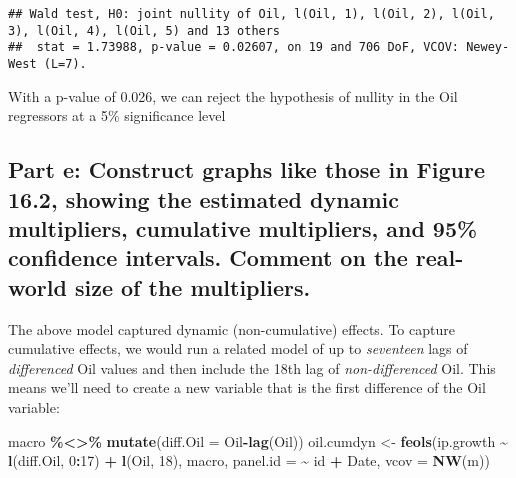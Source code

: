 \documentclass[
]{article}
\newenvironment{Shaded}{\begin{snugshade}}{\end{snugshade}}
\newcommand{\AttributeTok}[1]{\textcolor[rgb]{0.13,0.29,0.53}{#1}}
\newcommand{\DecValTok}[1]{\textcolor[rgb]{0.00,0.00,0.81}{#1}}
\newcommand{\FunctionTok}[1]{\textcolor[rgb]{0.13,0.29,0.53}{\textbf{#1}}}
\newcommand{\NormalTok}[1]{#1}
\newcommand{\OtherTok}[1]{\textcolor[rgb]{0.56,0.35,0.01}{#1}}
\newcommand{\SpecialCharTok}[1]{\textcolor[rgb]{0.81,0.36,0.00}{\textbf{#1}}}
\begin{document}
\begin{verbatim}
## Wald test, H0: joint nullity of Oil, l(Oil, 1), l(Oil, 2), l(Oil, 3), l(Oil, 4), l(Oil, 5) and 13 others
##  stat = 1.73988, p-value = 0.02607, on 19 and 706 DoF, VCOV: Newey-West (L=7).
\end{verbatim}

With a p-value of 0.026, we can reject the hypothesis of nullity in the
Oil regressors at a 5\% significance level

\hypertarget{part-e-construct-graphs-like-those-in-figure-16.2-showing-the-estimated-dynamic-multipliers-cumulative-multipliers-and-95-confidence-intervals.-comment-on-the-real-world-size-of-the-multipliers.}{%
\subsection{Part e: Construct graphs like those in Figure 16.2, showing
the estimated dynamic multipliers, cumulative multipliers, and 95\%
confidence intervals. Comment on the real-world size of the
multipliers.}\label{part-e-construct-graphs-like-those-in-figure-16.2-showing-the-estimated-dynamic-multipliers-cumulative-multipliers-and-95-confidence-intervals.-comment-on-the-real-world-size-of-the-multipliers.}}

The above model captured dynamic (non-cumulative) effects. To capture
cumulative effects, we would run a related model of up to
\emph{seventeen} lags of \emph{differenced} Oil values and then include
the 18th lag of \emph{non-differenced} Oil. This means we'll need to
create a new variable that is the first difference of the Oil variable:

\begin{Shaded}
\begin{Highlighting}[]
\NormalTok{macro }\SpecialCharTok{\%\textless{}\textgreater{}\%} \FunctionTok{mutate}\NormalTok{(}\AttributeTok{diff.Oil =}\NormalTok{ Oil}\SpecialCharTok{{-}}\FunctionTok{lag}\NormalTok{(Oil))}
\NormalTok{oil.cumdyn }\OtherTok{\textless{}{-}} \FunctionTok{feols}\NormalTok{(ip.growth }\SpecialCharTok{\textasciitilde{}} \FunctionTok{l}\NormalTok{(diff.Oil, }\DecValTok{0}\SpecialCharTok{:}\DecValTok{17}\NormalTok{) }\SpecialCharTok{+} \FunctionTok{l}\NormalTok{(Oil, }\DecValTok{18}\NormalTok{),}
\NormalTok{                        macro,}
                        \AttributeTok{panel.id =} \SpecialCharTok{\textasciitilde{}}\NormalTok{ id }\SpecialCharTok{+}\NormalTok{ Date,}
                        \AttributeTok{vcov =} \FunctionTok{NW}\NormalTok{(m))}
\end{Highlighting}
\end{Shaded}
\end{document}
